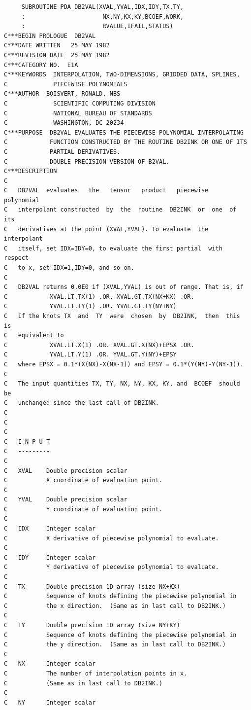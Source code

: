 \documentclass[11pt,twoside]{article}
\begin{document}
\begin{verbatim}
     SUBROUTINE PDA_DB2VAL(XVAL,YVAL,IDX,IDY,TX,TY,
     :                      NX,NY,KX,KY,BCOEF,WORK,
     :                      RVALUE,IFAIL,STATUS)
C***BEGIN PROLOGUE  DB2VAL
C***DATE WRITTEN   25 MAY 1982
C***REVISION DATE  25 MAY 1982
C***CATEGORY NO.  E1A
C***KEYWORDS  INTERPOLATION, TWO-DIMENSIONS, GRIDDED DATA, SPLINES,
C             PIECEWISE POLYNOMIALS
C***AUTHOR  BOISVERT, RONALD, NBS
C             SCIENTIFIC COMPUTING DIVISION
C             NATIONAL BUREAU OF STANDARDS
C             WASHINGTON, DC 20234
C***PURPOSE  DB2VAL EVALUATES THE PIECEWISE POLYNOMIAL INTERPOLATING
C            FUNCTION CONSTRUCTED BY THE ROUTINE DB2INK OR ONE OF ITS
C            PARTIAL DERIVATIVES.
C            DOUBLE PRECISION VERSION OF B2VAL.
C***DESCRIPTION
C
C   DB2VAL  evaluates   the   tensor   product   piecewise   polynomial
C   interpolant constructed  by  the  routine  DB2INK  or  one  of  its
C   derivatives at the point (XVAL,YVAL). To evaluate  the  interpolant
C   itself, set IDX=IDY=0, to evaluate the first partial  with  respect
C   to x, set IDX=1,IDY=0, and so on.
C
C   DB2VAL returns 0.0E0 if (XVAL,YVAL) is out of range. That is, if
C            XVAL.LT.TX(1) .OR. XVAL.GT.TX(NX+KX) .OR.
C            YVAL.LT.TY(1) .OR. YVAL.GT.TY(NY+NY)
C   If the knots TX  and  TY  were  chosen  by  DB2INK,  then  this  is
C   equivalent to
C            XVAL.LT.X(1) .OR. XVAL.GT.X(NX)+EPSX .OR.
C            YVAL.LT.Y(1) .OR. YVAL.GT.Y(NY)+EPSY
C   where EPSX = 0.1*(X(NX)-X(NX-1)) and EPSY = 0.1*(Y(NY)-Y(NY-1)).
C
C   The input quantities TX, TY, NX, NY, KX, KY, and  BCOEF  should  be
C   unchanged since the last call of DB2INK.
C
C
C
C   I N P U T
C   ---------
C
C   XVAL    Double precision scalar
C           X coordinate of evaluation point.
C
C   YVAL    Double precision scalar
C           Y coordinate of evaluation point.
C
C   IDX     Integer scalar
C           X derivative of piecewise polynomial to evaluate.
C
C   IDY     Integer scalar
C           Y derivative of piecewise polynomial to evaluate.
C
C   TX      Double precision 1D array (size NX+KX)
C           Sequence of knots defining the piecewise polynomial in
C           the x direction.  (Same as in last call to DB2INK.)
C
C   TY      Double precision 1D array (size NY+KY)
C           Sequence of knots defining the piecewise polynomial in
C           the y direction.  (Same as in last call to DB2INK.)
C
C   NX      Integer scalar
C           The number of interpolation points in x.
C           (Same as in last call to DB2INK.)
C
C   NY      Integer scalar

\end{verbatim}
\end{document}
